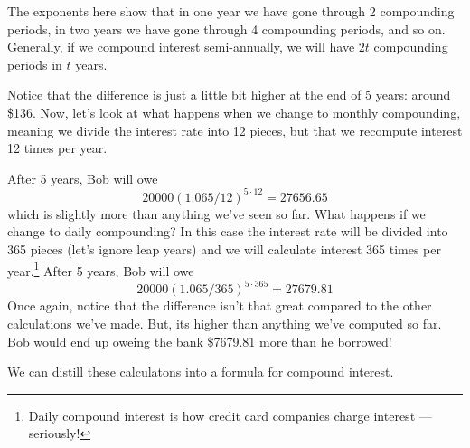 The exponents here show that in one year we have gone through 2 compounding periods, in two years we have gone through 4 compounding periods, and so on. Generally, if we compound interest semi-annually, we will have $2t$ compounding periods in $t$ years.

Notice that the difference is just a little bit higher at the end of 5 years: around \$136. Now, let's look at what happens when we change to monthly compounding, meaning we divide the interest rate into 12 pieces, but that we recompute interest 12 times per year.

After 5 years, Bob will owe
\[20000(1.065/12)^{5\cdot12} = 27656.65\]
which is slightly more than anything we've seen so far. What happens if we change to daily compounding? In this case the interest rate will be divided into 365 pieces (let's ignore leap years) and we will calculate interest 365 times per year.\footnote{Daily compound interest is how credit card companies charge interest --- seriously!} After 5 years, Bob will owe
\[20000(1.065/365)^{5\cdot365} = 27679.81\]
Once again, notice that the difference isn't that great compared to the other calculations we've made. But, its higher than anything we've computed so far. Bob would end up oweing the bank \$7679.81 more than he borrowed!


We can distill these calculatons into a formula for compound interest.

